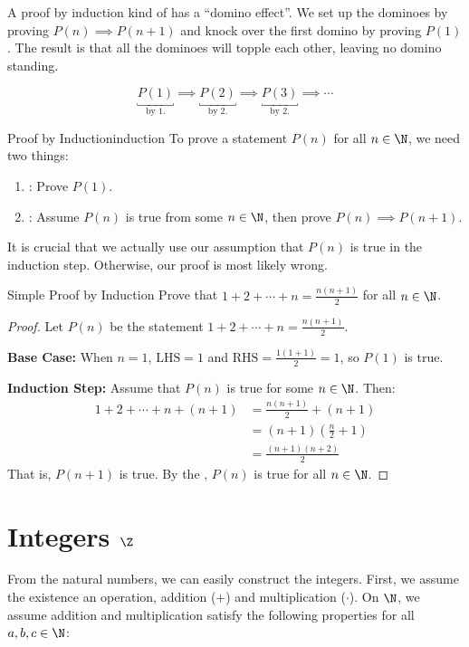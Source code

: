 A proof by induction kind of has a ``domino effect''. We set up the dominoes by proving $P(n) \implies P(n+1)$ and knock over the first domino by proving $P(1)$. The result is that all the dominoes will topple each other, leaving no domino standing.

\[ \underbracket{P(1)}_{\text{by 1.}} \implies \underbracket{P(2)}_{\text{by 2.}} \implies \underbracket{P(3)}_{\text{by 2.}} \implies \cdots \]

\begin{tecbox}{Proof by Induction}{induction}
    To prove a statement $P(n)$ for all $n \in \N$, we need two things:
    \begin{enumerate}
        \item {}: Prove $P(1)$.
        \item {}: Assume $P(n)$ is true from some $n \in \N$, then prove $P(n) \implies P(n+1)$.
    \end{enumerate}
\end{tecbox}

It is crucial that we actually use our assumption that $P(n)$ is true in the induction step. Otherwise, our proof is most likely wrong.

\begin{exbox}{Simple Proof by Induction}{}
    Prove that $1+2+\cdots + n = \frac{n(n+1)}{2}$ for all $n \in \N$.
    \tcblower
    \begin{proof}
        Let $P(n)$ be the statement $1 + 2 + \cdots + n = \frac{n(n+1)}{2}$.

        \textbf{Base Case:} When $n=1$, $\text{LHS} = 1$ and $\text{RHS} = \frac{1(1+1)}{2} = 1$, so $P(1)$ is true.

        \textbf{Induction Step:} Assume that $P(n)$ is true for some $n \in \N$. Then:
        \begin{align*}
            1 + 2 + \cdots + n + (n+1)
            &= \frac{n(n+1)}{2} + (n+1) \\
            &= (n+1) \left( \frac{n}{2} + 1 \right) \\
            &= \frac{(n+1)(n+2)}{2}
        \end{align*}
        That is, $P(n+1)$ is true. By the , $P(n)$ is true for all $n \in \N$.
    \end{proof}
\end{exbox}

\section{Integers $\Z$}
From the natural numbers, we can easily construct the integers. First, we assume the existence an operation, addition ($+$) and multiplication ($\cdot$). On $\N$, we assume addition and multiplication satisfy the following properties for all $a,b,c \in \N$:


